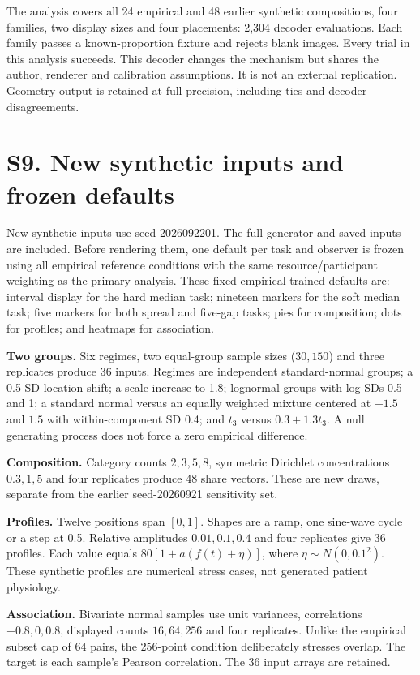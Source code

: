 \documentclass[10pt]{article}
\begin{document}
The analysis covers all 24 empirical and 48 earlier synthetic compositions, four families, two display sizes and four placements: 2,304 decoder evaluations. Each family passes a known-proportion fixture and rejects blank images. Every trial in this analysis succeeds. This decoder changes the mechanism but shares the author, renderer and calibration assumptions. It is not an external replication. Geometry output is retained at full precision, including ties and decoder disagreements.

\section*{S9. New synthetic inputs and frozen defaults}
New synthetic inputs use seed 2026092201. The full generator and saved inputs are included. Before rendering them, one default per task and observer is frozen using all empirical reference conditions with the same resource/participant weighting as the primary analysis. These fixed empirical-trained defaults are: interval display for the hard median task; nineteen markers for the soft median task; five markers for both spread and five-gap tasks; pies for composition; dots for profiles; and heatmaps for association.

\textbf{Two groups.} Six regimes, two equal-group sample sizes ($30,150$) and three replicates produce 36 inputs. Regimes are independent standard-normal groups; a 0.5-SD location shift; a scale increase to 1.8; lognormal groups with log-SDs 0.5 and 1; a standard normal versus an equally weighted mixture centered at $-1.5$ and $1.5$ with within-component SD 0.4; and $t_3$ versus $0.3+1.3t_3$. A null generating process does not force a zero empirical difference.

\textbf{Composition.} Category counts $2,3,5,8$, symmetric Dirichlet concentrations $0.3,1,5$ and four replicates produce 48 share vectors. These are new draws, separate from the earlier seed-20260921 sensitivity set.

\textbf{Profiles.} Twelve positions span $[0,1]$. Shapes are a ramp, one sine-wave cycle or a step at 0.5. Relative amplitudes $0.01,0.1,0.4$ and four replicates give 36 profiles. Each value equals $80[1+a(f(t)+\eta)]$, where $\eta\sim N(0,0.1^2)$. These synthetic profiles are numerical stress cases, not generated patient physiology.

\textbf{Association.} Bivariate normal samples use unit variances, correlations $-0.8,0,0.8$, displayed counts $16,64,256$ and four replicates. Unlike the empirical subset cap of 64 pairs, the 256-point condition deliberately stresses overlap. The target is each sample's Pearson correlation. The 36 input arrays are retained.
\end{document}
